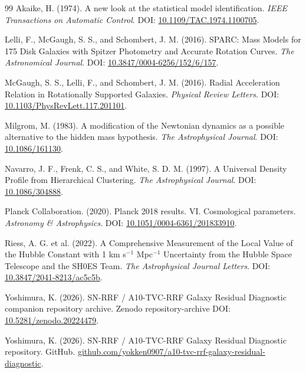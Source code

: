 \documentclass[11pt,a4paper]{article}
\begin{document}
\begin{thebibliography}{99}
Akaike, H. (1974). A new look at the statistical model identification. \emph{IEEE Transactions on Automatic Control}. DOI: \href{https://doi.org/10.1109/TAC.1974.1100705}{10.1109/TAC.1974.1100705}.

Lelli, F., McGaugh, S. S., and Schombert, J. M. (2016). SPARC: Mass Models for 175 Disk Galaxies with Spitzer Photometry and Accurate Rotation Curves. \emph{The Astronomical Journal}. DOI: \href{https://doi.org/10.3847/0004-6256/152/6/157}{10.3847/0004-6256/152/6/157}.

McGaugh, S. S., Lelli, F., and Schombert, J. M. (2016). Radial Acceleration Relation in Rotationally Supported Galaxies. \emph{Physical Review Letters}. DOI: \href{https://doi.org/10.1103/PhysRevLett.117.201101}{10.1103/PhysRevLett.117.201101}.

Milgrom, M. (1983). A modification of the Newtonian dynamics as a possible alternative to the hidden mass hypothesis. \emph{The Astrophysical Journal}. DOI: \href{https://doi.org/10.1086/161130}{10.1086/161130}.

Navarro, J. F., Frenk, C. S., and White, S. D. M. (1997). A Universal Density Profile from Hierarchical Clustering. \emph{The Astrophysical Journal}. DOI: \href{https://doi.org/10.1086/304888}{10.1086/304888}.

Planck Collaboration. (2020). Planck 2018 results. VI. Cosmological parameters. \emph{Astronomy \& Astrophysics}. DOI: \href{https://doi.org/10.1051/0004-6361/201833910}{10.1051/0004-6361/201833910}.

Riess, A. G. et al. (2022). A Comprehensive Measurement of the Local Value of the Hubble Constant with 1 km s$^{-1}$ Mpc$^{-1}$ Uncertainty from the Hubble Space Telescope and the SH0ES Team. \emph{The Astrophysical Journal Letters}. DOI: \href{https://doi.org/10.3847/2041-8213/ac5c5b}{10.3847/2041-8213/ac5c5b}.

Yoshimura, K. (2026). SN-RRF / A10-TVC-RRF Galaxy Residual Diagnostic companion repository archive. Zenodo repository-archive DOI: \href{https://doi.org/10.5281/zenodo.20224479}{10.5281/zenodo.20224479}.

Yoshimura, K. (2026). SN-RRF / A10-TVC-RRF Galaxy Residual Diagnostic repository. GitHub. \href{https://github.com/yokken0907/a10-tvc-rrf-galaxy-residual-diagnostic}{github.com/yokken0907/a10-tvc-rrf-galaxy-residual-diagnostic}.
\end{thebibliography}
\end{document}
